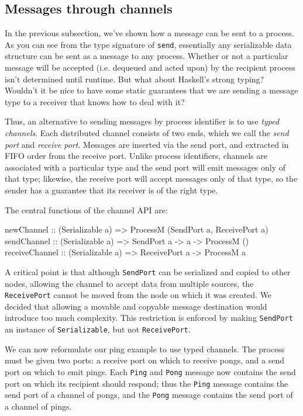 \documentclass[preprint]{sigplanconf}
\begin{document}
\subsection{Messages through channels}
In the previous subsection, we've shown how a message can be sent to a process. As you can see from the type signature of \texttt{send}, essentially any serializable data structure can be sent as a message to any process. Whether or not a particular message will be accepted (i.e. dequeued and acted upon) by the recipient process isn't determined until runtime. But what about Haskell's strong typing? Wouldn't it be nice to have some static guarantees that we are sending a message type to a receiver that knows how to deal with it?

Thus, an alternative to sending messages by process identifier is to use {\em typed channels}. Each distributed channel consists of two ends, which we call the {\em send port} and {\em receive port}. Messages are inserted via the send port, and extracted in FIFO order from the receive port. Unlike process identifiers, channels are associated with a particular type and the send port will emit messages only of that type; likewise, the receive port will accept messages only of that type, so the sender has a guarantee that its receiver is of the right type.

The central functions of the channel API are:

\begin{code}
newChannel :: (Serializable a) => ProcessM (SendPort a, ReceivePort a)
sendChannel :: (Serializable a) => SendPort a -> a -> ProcessM ()
receiveChannel :: (Serializable a) => ReceivePort a -> ProcessM a
\end{code}

A critical point is that although \texttt{SendPort} can be serialized and copied to other nodes, allowing the channel to accept data from multiple sources, the \texttt{ReceivePort} cannot be moved from the node on which it was created. We decided that allowing a movable and copyable message destination would introduce too much complexity. This restriction is enforced by making \texttt{SendPort} an instance of \texttt{Serializable}, but not \texttt{ReceivePort}. 

We can now reformulate our ping example to use typed channels. The process must be given two ports: a receive port on which to receive pongs, and a send port on which to emit pings. Each \texttt{Ping} and \texttt{Pong} message now contains the send port on which its recipient should respond; thus the \texttt{Ping} message contains the send port of a channel of pongs, and the \texttt{Pong} message contains the send port of a channel of pings.
\end{document}
